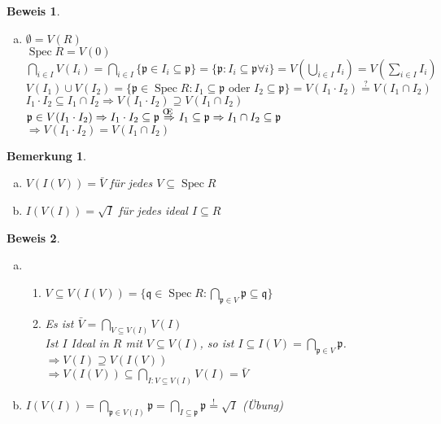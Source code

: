 \documentclass[a4paper,12pt]{report}
\theoremstyle{break}
\newtheorem{Bem}[Def]{Bemerkung}
\theoremstyle{nonumberbreak}
\newtheorem{bew}{Beweis}
\theoremstyle{nonumberplain}
\newcommand{\quot}[1]{\textrm{\glqq}{#1}\textrm{\grqq}}
\newenvironment{twosidedproof}{\begin{enumerate}[\quot{$\Rightarrow$}:]}{\end{enumerate}}
\newcommand{\proofsubseteq}{\item[\quot{$\subseteq$}:]}
\newcommand{\proofsupseteq}{\item[\quot{$\supseteq$}:]}
\DeclareMathOperator{\Spec}{Spec}
\newcommand{\p}{\mathfrak{p}}
\newcommand{\q}{\mathfrak{q}}
\renewcommand{\OE}{O\!\!E~}
\begin{document}
\begin{bew}\begin{enumerate}[a)]\item[c)]
$\emptyset = V(R)$\\
$\Spec R = V(0)$\\
$\bigcap\limits_{i\in I} V(I_i) = \bigcap\limits_{i\in I}\{\p \in I_i \subseteq \p\} = \{\p: I_i \subseteq \p \forall i\} = V(\bigcup\limits_{i\in I} I_i) = V(\sum\limits_{i\in I} I_i)$\\
$V(I_1)\cup V(I_2) = \{\p \in \Spec R: I_1 \subseteq \p \text{ oder } I_2 \subseteq \p\} = V(I_1\cdot I_2) \overset{?}{=} V(I_1\cap I_2)$\\
\hspace*{10mm} $I_1\cdot I_2 \subseteq I_1 \cap I_2 \Rightarrow V(I_1\cdot I_2) \supseteq V(I_1\cap I_2)$\\
\hspace*{10mm} $\p \in V(I_1\cdot I_2) \Rightarrow I_1\cdot I_2 \subseteq \p \overset{\text{\OE}}{\Rightarrow} I_1 \subseteq \p \Rightarrow I_1\cap I_2 \subseteq \p$\\
$\Rightarrow V(I_1\cdot I_2) = V(I_1\cap I_2)$
\end{enumerate}\end{bew}

\begin{Bem}\begin{enumerate}[a)]
\item
	$V(I(V)) = \bar{V}$ f\"ur jedes $V\subseteq \Spec R$
\item
	$I(V(I)) = \sqrt{I}$ f\"ur jedes ideal $I\subseteq R$
\end{enumerate}\end{Bem}

\begin{bew}\begin{enumerate}[a)]
\item
	\begin{twosidedproof}
	\proofsupseteq
		$V\subseteq V(I(V)) = \{\q \in \Spec R: \bigcap\limits_{\p \in V} \p \subseteq \q \}$
	\proofsubseteq
		Es ist $\bar{V} = \bigcap\limits_{V\subseteq V(I)}V(I)$\\
		Ist $I$ Ideal in $R$ mit $V\subseteq V(I)$, so ist $I\subseteq I(V) = \bigcap\limits_{\p \in V} \p$.\\
		$\Rightarrow V(I) \supseteq V(I(V))$\\
		$\Rightarrow V(I(V)) \subseteq \bigcap\limits_{I:V\subseteq V(I)} V(I) = \bar{V}$
	\end{twosidedproof}
\item
	$I(V(I)) = \bigcap\limits_{\p \in V(I)} \p = \bigcap\limits_{I\subseteq \p} \p \overset{!}{=} \sqrt{I}$ (\"Ubung)
\end{enumerate}\end{bew}
\end{document}
